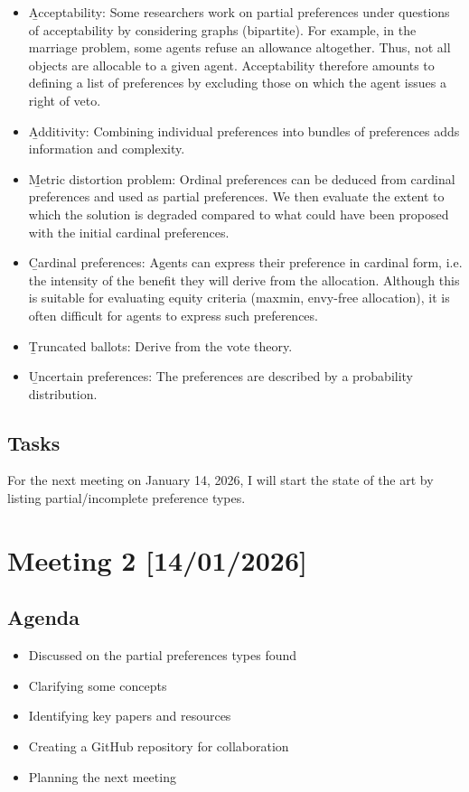 \documentclass{article}
\begin{document}
\begin{itemize}
    \item \b{Acceptability:} Some researchers work on partial preferences under questions of acceptability by considering graphs (bipartite). For example, in the marriage problem, some agents refuse an allowance altogether. Thus, not all objects are allocable to a given agent. Acceptability therefore amounts to defining a list of preferences by excluding those on which the agent issues a right of veto.
    \item \b{Additivity:} Combining individual preferences into bundles of preferences adds information and complexity.
    \item \b{Metric distortion problem:} Ordinal preferences can be deduced from cardinal preferences and used as partial preferences. We then evaluate the extent to which the solution is degraded compared to what could have been proposed with the initial cardinal preferences.
    \item \b{Cardinal preferences:}	Agents can express their preference in cardinal form, i.e. the intensity of the benefit they will derive from the allocation. Although this is suitable for evaluating equity criteria (maxmin, envy-free allocation), it is often difficult for agents to express such preferences.
    \item \b{Truncated ballots:} Derive from the vote theory.
    \item \b{Uncertain preferences:} The preferences are described by a probability distribution.
\end{itemize}

\subsection{Tasks}
For the next meeting on January 14, 2026, I will start the state of the art by listing partial/incomplete preference types.

\newpage

\section{Meeting 2 [14/01/2026]}

\subsection{Agenda}
\begin{itemize}
    \item Discussed on the partial preferences types found
    \item Clarifying some concepts
    \item Identifying key papers and resources
    \item Creating a GitHub repository for collaboration
    \item Planning the next meeting
\end{itemize}
\end{document}
